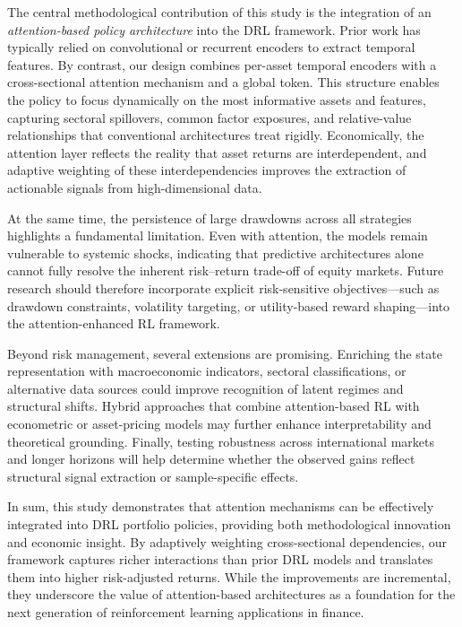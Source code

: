 \documentclass[10pt,leqno]{amsart}
\begin{document}
The central methodological contribution of this study is the integration of an \emph{attention-based policy architecture} into the DRL framework. Prior work has typically relied on convolutional or recurrent encoders to extract temporal features. By contrast, our design combines per-asset temporal encoders with a cross-sectional attention mechanism and a global token. This structure enables the policy to focus dynamically on the most informative assets and features, capturing sectoral spillovers, common factor exposures, and relative-value relationships that conventional architectures treat rigidly. Economically, the attention layer reflects the reality that asset returns are interdependent, and adaptive weighting of these interdependencies improves the extraction of actionable signals from high-dimensional data.

At the same time, the persistence of large drawdowns across all strategies highlights a fundamental limitation. Even with attention, the models remain vulnerable to systemic shocks, indicating that predictive architectures alone cannot fully resolve the inherent risk–return trade-off of equity markets. Future research should therefore incorporate explicit risk-sensitive objectives—such as drawdown constraints, volatility targeting, or utility-based reward shaping—into the attention-enhanced RL framework.

Beyond risk management, several extensions are promising. Enriching the state representation with macroeconomic indicators, sectoral classifications, or alternative data sources could improve recognition of latent regimes and structural shifts. Hybrid approaches that combine attention-based RL with econometric or asset-pricing models may further enhance interpretability and theoretical grounding. Finally, testing robustness across international markets and longer horizons will help determine whether the observed gains reflect structural signal extraction or sample-specific effects.

In sum, this study demonstrates that attention mechanisms can be effectively integrated into DRL portfolio policies, providing both methodological innovation and economic insight. By adaptively weighting cross-sectional dependencies, our framework captures richer interactions than prior DRL models and translates them into higher risk-adjusted returns. While the improvements are incremental, they underscore the value of attention-based architectures as a foundation for the next generation of reinforcement learning applications in finance.
\end{document}
